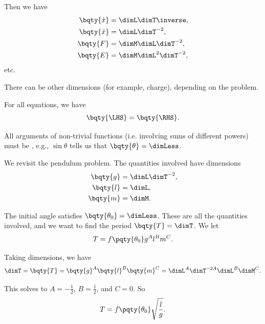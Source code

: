 Then we have
\begin{subequations}\begin{align}
    \bqty{\dot{x}} &= \dimL \dimT\inverse, \\
    \bqty{\ddot{x}} &= \dimL \dimT^{-2}, \\
    \bqty{F} &= \dimM \dimL \dimT^{-2}, \\
    \bqty{E} &= \dimM \dimL^2 \dimT^{-2},
\end{align}\end{subequations}
etc.

There can be other dimensions (for example, charge), depending on the problem.

For all equations, we have
\begin{equation}
    \bqty{\LHS} = \bqty{\RHS}.
\end{equation}

All arguments of non-trivial functions (i.e. involving sums of different powers) must be , e.g., \(\sin \theta\) tells us that \(\bqty{\theta} = \dimLess\).

\begin{example}
    \label{ex:dimensional-analysis-pendulum}%
    We revisit the pendulum problem. The quantities involved have dimensions
    \begin{subequations}\begin{align}
        \bqty{g} &= \dimL \dimT^{-2}, \\
        \bqty{l} &= \dimL, \\
        \bqty{m} &= \dimM.
    \end{align}\end{subequations}

    The initial angle satisfies \(\bqty{\theta_0} = \dimLess\). These are all the quantities involved, and we want to find the period \(\bqty{T} = \dimT\). We let
    \begin{equation}
        T = f\pqty{\theta_0} g^A l^B m^C.
    \end{equation}

    Taking dimensions, we have
    \begin{equation}
        \dimT = \bqty{T} = \bqty{g}^A \bqty{l}^B \bqty{m}^C = \dimL^A \dimT^{-2A} \dimL^{B} \dimM^{C}.
    \end{equation}

    This solves to \(A = - \frac{1}{2}\), \(B = \frac{1}{2}\), and \(C = 0\). So
    \begin{equation}
        T = f\pqty{\theta_0} \sqrt{\frac{l}{g}}.
    \end{equation}
\end{example}

